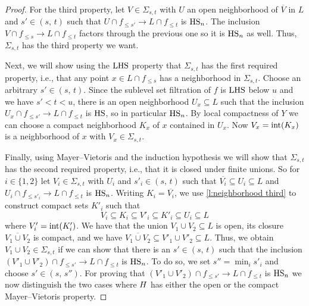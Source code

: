 \begin{proof}
	For the third property, let $V \in \Sigma_{s,t}$ with $U$ an open neighborhood of $\overline{V}$ in $L$ and $s' \in (s,\, t)$ such that
	$U \cap f_{\leq s'} \to L \cap f_{\leq t}$
	is $\mathrm{HS}_n$.
	The inclusion
	$V \cap f_{\leq s} \to L \cap f_{\leq t}$
	factors through the previous one so it is $\mathrm{HS}_n$ as well.
	Thus, $\Sigma_{s, t}$ has the third property we want.

	Next, we will show using the $\mathrm{LHS}$ property that $\Sigma_{s, t}$ has the first required property, i.e., that any point $x \in L \cap f_{\leq s}$ has a neighborhood in $\Sigma_{s, t}$.
	Choose an arbitrary $s' \in (s,\, t)$.
	Since the sublevel set filtration of $f$ is $\mathrm{LHS}$ below $u$ and we have $s' < t < u$, there is an open neighborhood $U_x \subseteq L$ such that the inclusion
	$U_x \cap f_{\leq s'} \to L \cap f_{\leq t}$
	is $\mathrm{HS}$, so in particular $\mathrm{HS}_n$.
	By local compactness of $Y$ we can choose a compact neighborhood $K_x$ of $x$ contained in $U_x$.
	Now $V_x = \operatorname{int} (K_x)$ is a neighborhood of $x$ with $V_x \in \Sigma_{s,t}$.

	Finally, using Mayer--Vietoris and the induction hypothesis we will show that $\Sigma_{s,t}$ has the second required property, i.e., that it is closed under finite unions.
	So for $i \in \{1, 2\}$ let $V_i \in \Sigma_{s,t}$ with $U_i$ and $s'_i \in (s,\, t)$ such that
	$\overline{V_i} \subseteq U_i \subseteq L$
	and
	$U_{i} \cap f_{\leq s'_i} \to L \cap f_{\leq t}$
	is $\mathrm{HS}_n$.
	Writing $K_i = \overline{V_i}$, we use \cref{l:neighborhood third} to construct compact sets $K'_i$ such that
	\begin{equation*}
	V_i \subseteq K_i \subseteq V'_i \subseteq K'_i \subseteq U_i \subseteq L
	\end{equation*}
	where $V'_i = \operatorname{int}(K'_i)$.
	We have that the union $V_1 \cup V_2 \subseteq L$ is open, its closure $\overline{V_1 \cup V_2}$ is compact, and we have $\overline{V_1 \cup V_2} \subseteq V'_1 \cup V'_2 \subseteq L$.
	Thus, we obtain $V_1 \cup V_2 \in \Sigma_{s,t}$ if we can show that there is an $s' \in (s,\, t)$ such that the inclusion
	$\left(V'_1 \cup V'_2 \right) \cap f_{\leq s'} \to L \cap f_{\leq t}$
	is $\mathrm{HS}_n$.
	To do so, we set $s'' = \min_i s'_i$ and choose $s' \in (s,\, s'')$.
	For proving that $\left(V'_1 \cup V'_2 \right) \cap f_{\leq s'} \to L \cap f_{\leq t}$ is $\mathrm{HS}_n$ we now distinguish the two cases where $H$ has either the open or the compact Mayer--Vietoris property.


\end{proof}
